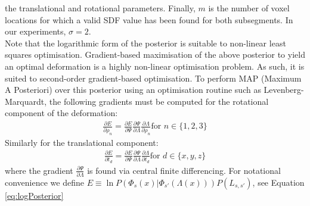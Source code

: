 the translational and rotational parameters. Finally, $m$ is the number of voxel locations for which a valid SDF value has been found for both subsegments. In our experiments, $\sigma = 2$.\\
Note that the logarithmic form of the posterior is suitable to non-linear least squares optimisation. Gradient-based maximisation of the above posterior to yield an optimal deformation is a highly non-linear optimisation problem. As such, it is suited to second-order gradient-based optimisation. To perform MAP (Maximum A Posteriori) over this posterior using 
an optimisation routine such as Levenberg-Marquardt, the following gradients must be computed for the rotational component of the 
deformation:
\begin{equation}
\begin{split}
\frac{\partial E}{\partial \rho_{n}} = \frac{\partial E}{\partial \Psi} \frac{\partial \Psi}{\partial \Lambda} \frac{\partial \Lambda}{\partial \rho_{n}} \text{for } n \in \{1,2,3\}
\end{split}
\end{equation}
Similarly for the translational component:
\begin{equation}
\begin{split}
\frac{\partial E}{\partial t_{d}} = \frac{\partial E}{\partial \Psi} \frac{\partial \Psi}{\partial \Lambda} \frac{\partial \Lambda}{\partial t_{d}} \text{for } d \in  \{x,y,z\}
\end{split}
\end{equation}
where the gradient $\frac{\partial \Psi}{\partial \Lambda}$ is found via central finite differencing.
For notational convenience we define $E \equiv \ln P(\Phi_{s}(x) | \Phi_{s'}(\Lambda(x)))P(L_{s, s'})$, see Equation \ref{eq:logPosterior}

